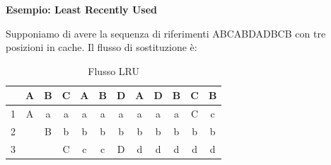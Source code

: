 \noindent\textbf{Esempio: Least Recently Used}\par
Supponiamo di avere la sequenza di riferimenti ABCABDADBCB con tre posizioni in cache. Il flusso di sostituzione è: \begin{table}[h]
    \centering
    \begin{tabular}{|c|c|c|c|c|c|c|c|c|c|c|c|}
        \hline
         & A & B & C & A & B & D & A & D & B & C & B\\
        \hline
        1 & A & a & a & a & a & a & a & a & a & C & c\\
        \hline
        2 & & B & b & b & b & b & b & b & b & b & b\\
        \hline
        3 & & & C & c & c & D & d & d & d & d & d\\
        \hline
    \end{tabular}
    \caption{Flusso LRU}
\end{table}

